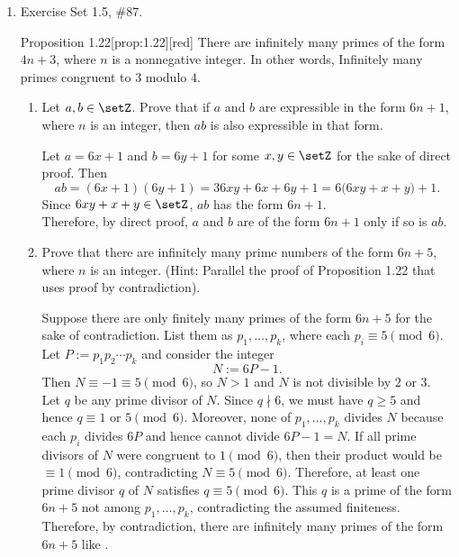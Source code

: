 \begin{enumerate}
\newpage 
\item Exercise Set 1.5, \#87.
\begin{define}{Proposition 1.22}[prop:1.22][red]
  There are infinitely many primes of the form $4n+3$, where $n$ is a nonnegative integer.
  In other words, Infinitely many primes congruent to $3$ modulo $4$.
\end{define}
\begin{enumerate}
\item Let $a,b \in \setZ$. Prove that if $a$ and $b$ are expressible in the form $6n+1$, 
where $n$ is an integer, then $ab$ is also expressible in that form.
\begin{subprove}
  Let $a=6x+1$ and $b=6y+1$ for some $x,y\in\setZ$ for the sake of direct proof. Then
  \[
    ab=(6x+1)(6y+1)=36xy+6x+6y+1=6\bigl(6xy+x+y\bigr)+1.
  \]
  Since $6xy+x+y\in\setZ$, $ab$ has the form $6n+1$.\vspace*{10px}\\
  Therefore, by direct proof, $a$ and $b$ are of the form $6n+1$ only if so is $ab$.
\end{subprove}
\item Prove that there are infinitely many prime numbers of the form $6n+5$, where $n$ is an integer. 
(Hint: Parallel the proof of Proposition 1.22 that uses proof by contradiction).
\begin{subprove}
  Suppose there are only finitely many primes of the form $6n+5$ for the sake of contradiction.
  List them as $p_1,\dots,p_k$, where each $p_i\equiv 5\pmod{6}$. Let $P:=p_1p_2\cdots p_k$ and
  consider the integer
  \[
    N:=6P-1.
  \]
  Then $N\equiv -1\equiv 5\pmod{6}$, so $N>1$ and $N$ is not divisible by $2$ or $3$.
  Let $q$ be any prime divisor of $N$. Since $q\nmid 6$, we must have $q\ge 5$ and hence
  $q\equiv 1\text{ or }5\pmod{6}$. Moreover, none of $p_1,\dots,p_k$ divides $N$ because each $p_i$ divides $6P$ and hence cannot divide $6P-1=N$.
  If all prime divisors of $N$ were congruent to $1\pmod{6}$, then their product would be $\equiv 1\pmod{6}$, contradicting $N\equiv 5\pmod{6}$. Therefore, at least one prime divisor $q$ of $N$ satisfies $q\equiv 5\pmod{6}$.
  This $q$ is a prime of the form $6n+5$ not among $p_1,\dots,p_k$, contradicting the assumed finiteness.\vspace*{10px}\\
  Therefore, by contradiction, there are infinitely many primes of the form $6n+5$ like .
\end{subprove}
\end{enumerate}






\end{enumerate}
